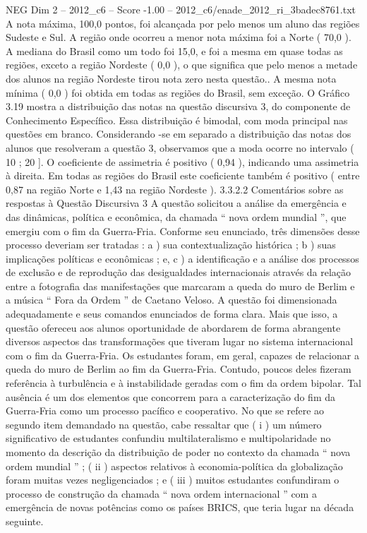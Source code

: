 \begin{textsample}{NEG Dim 2 – 2012\_c6 – Score -1.00 – 2012\_c6/enade\_2012\_ri\_3badec8761.txt}
A nota máxima, 100,0 pontos, foi alcançada por pelo menos um aluno das regiões Sudeste e Sul.
A região onde ocorreu a menor nota máxima foi a Norte ( 70,0 ).
A mediana do Brasil como um todo foi 15,0, e foi a mesma em quase todas as regiões, exceto a região Nordeste ( 0,0 ), o que significa que pelo menos a metade dos alunos na região Nordeste tirou nota zero nesta questão..
A mesma nota mínima ( 0,0 ) foi obtida em todas as regiões do Brasil, sem exceção.
O Gráfico 3.19 mostra a distribuição das notas na questão discursiva 3, do componente de Conhecimento Específico.
Essa distribuição é bimodal, com moda principal nas questões em branco.
Considerando -se em separado a distribuição das notas dos alunos que resolveram a questão 3, observamos que a moda ocorre no intervalo ( 10 ; 20 ].
O coeficiente de assimetria é positivo ( 0,94 ), indicando uma assimetria à direita.
Em todas as regiões do Brasil este coeficiente também é positivo ( entre 0,87 na região Norte e 1,43 na região Nordeste ). 3.3.2.2 Comentários sobre as respostas à Questão Discursiva 3 A questão solicitou a análise da emergência e das dinâmicas, política e econômica, da chamada “ nova ordem mundial ”, que emergiu com o fim da Guerra-Fria.
Conforme seu enunciado, três dimensões desse processo deveriam ser tratadas : a ) sua contextualização histórica ; b ) suas implicações políticas e econômicas ; e, c ) a identificação e a análise dos processos de exclusão e de reprodução das desigualdades internacionais através da relação entre a fotografia das manifestações que marcaram a queda do muro de Berlim e a música “ Fora da Ordem ” de Caetano Veloso.
A questão foi dimensionada adequadamente e seus comandos enunciados de forma clara.
Mais que isso, a questão ofereceu aos alunos oportunidade de abordarem de forma abrangente diversos aspectos das transformações que tiveram lugar no sistema internacional com o fim da Guerra-Fria.
Os estudantes foram, em geral, capazes de relacionar a queda do muro de Berlim ao fim da Guerra-Fria.
Contudo, poucos deles fizeram referência à turbulência e à instabilidade geradas com o fim da ordem bipolar.
Tal ausência é um dos elementos que concorrem para a caracterização do fim da Guerra-Fria como um processo pacífico e cooperativo.
No que se refere ao segundo item demandado na questão, cabe ressaltar que ( i ) um número significativo de estudantes confundiu multilateralismo e multipolaridade no momento da descrição da distribuição de poder no contexto da chamada “ nova ordem mundial ” ; ( ii ) aspectos relativos à economia-política da globalização foram muitas vezes negligenciados ; e ( iii ) muitos estudantes confundiram o processo de construção da chamada “ nova ordem internacional ” com a emergência de novas potências como os países BRICS, que teria lugar na década seguinte.

\end{textsample}
